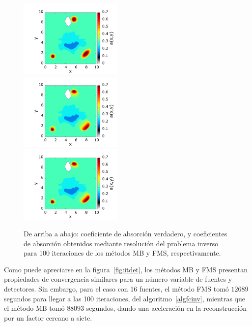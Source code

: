 \pagebreak 
\begin{figure}
\centering
  \includegraphics[width=0.45\textwidth]{figuras/necktrue.png}\\

  \includegraphics[width=0.45\textwidth]{figuras/necksweep.png}\\

  \includegraphics[width=0.45\textwidth]{figuras/neckmss.png}
  \caption{De arriba a abajo: coeficiente de absorción verdadero, y
  coeficientes de absorción obtenidos mediante resolución del problema inverso para 100 iteraciones de los métodos MB y FMS, respectivamente.}
 \label{fig:reconst}
\end{figure}
Como puede apreciarse en la figura~\ref{fig:itdet}, los métodos MB y FMS 
presentan propiedades de convergencia similares para un número variable 
de fuentes y detectores. Sin embargo, para el caso con 16 fuentes, 
el método FMS tomó  $12689$ segundos para llegar a las 100 iteraciones, 
del algoritmo~\ref{algfcinv}, mientras que el método MB tomó $88093$ segundos, 
dando una aceleración en la reconstrucción por un factor cercano a siete. 

